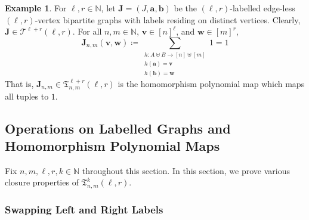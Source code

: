 \documentclass[11pt, DIV=15]{scrarticle}
\theoremstyle{definition}
\newtheorem{example}[definition]{Example}
\theoremstyle{plain}
\theoremstyle{remark}
\begin{document}
	\begin{example}\label{ex:one}
		For $\ell, r \in \mathbb{N}$,
		let $\boldsymbol{J} = (J, \boldsymbol{a}, \boldsymbol{b})$ be the $(\ell, r)$-labelled edge-less $(\ell, r)$-vertex bipartite graphs with labels residing on distinct vertices. 
		Clearly, $\boldsymbol{J} \in \mathcal{T}^{\ell+r}(\ell, r)$.
		For all $n, m \in \mathbb{N}$, $\boldsymbol{v} \in [n]^\ell$, and $\boldsymbol{w} \in [m]^r$,
		\[
			\boldsymbol{J}_{n,m}(\boldsymbol{v}, \boldsymbol{w}) \coloneqq \sum_{\substack{h \colon A \uplus B \to [n] \uplus [m]\\ h(\boldsymbol{a}) = \boldsymbol{v} \\ h(\boldsymbol{b}) = \boldsymbol{w}}} 1 = 1
		\]
		That is, $\boldsymbol{J}_{n,m} \in \mathfrak{T}^{\ell+r}_{n,m}(\ell, r)$ is the homomorphism polynomial map which maps all tuples to $1$.
	\end{example}

	
	

	\subsection{Operations on Labelled Graphs and Homomorphism Polynomial Maps}
	\label{sec:ops}
	
	Fix  $n,m, \ell, r, k \in \mathbb{N}$ throughout this section.
	In this section, we prove various closure properties of $\mathfrak{T}_{n,m}^k(\ell, r)$.
	\subsubsection{Swapping Left and Right Labels}
	
\end{document}

